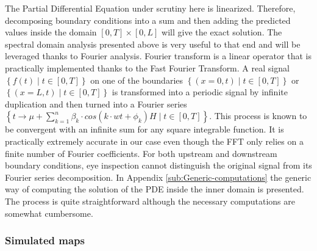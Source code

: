 \documentclass[preprint]{elsarticle}
\begin{document}
The Partial Differential Equation under scrutiny here is linearized.
Therefore, decomposing boundary conditions into a sum and then adding
the predicted values inside the domain $\left[0,T\right]\times\left[0,L\right]$
will give the exact solution. The spectral domain analysis presented
above is very useful to that end and will be leveraged thanks to Fourier
analysis. Fourier transform is a linear operator that is practically
implemented thanks to the Fast Fourier Transform. A real signal $\left\{ f\left(t\right)\mid t\in\left[0,T\right]\right\} $
on one of the boundaries $\left\{ \left(x=0,t\right)\mid t\in\left[0,T\right]\right\} $
or $\left\{ \left(x=L,t\right)\mid t\in\left[0,T\right]\right\} $
is transformed into a periodic signal by infinite duplication and
then turned into a Fourier series $\left\{ t\rightarrow\mu+\sum_{k=1}^{n}\beta_{k}\cdot cos\left(k\cdot wt+\phi_{k}\right)H\mid t\in\left[0,T\right]\right\} $.
This process is known to be convergent with an infinite sum for any
square integrable function. It is practically extremely accurate in
our case even though the FFT only relies on a finite number of Fourier
coefficients. For both upstream and downstream boundary conditions,
eye inspection cannot distinguish the original signal from its Fourier
series decomposition. In Appendix \ref{sub:Generic-computations}
the generic way of computing the solution of the PDE inside the inner
domain is presented. The process is quite straightforward although
the necessary computations are somewhat cumbersome.


\subsubsection{Simulated maps}
\end{document}
